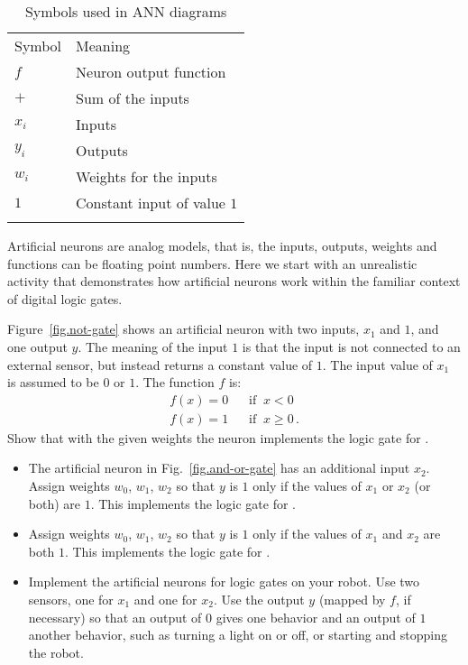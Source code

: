 \begin{table}
\caption{Symbols used in ANN diagrams}
\label{tab.ann-symbols}
\begin{tabular}{p{2cm}p{4cm}}
\svhline\noalign{\smallskip}
Symbol & Meaning \\
\noalign{\smallskip}\svhline\noalign{\smallskip}
$f$ & Neuron output function\\
$+$ & Sum of the inputs\\
$x_i$ & Inputs\\
$y_i$ & Outputs\\
$w_{i}$ & Weights for the inputs\\
$1$ & Constant input of value $1$\\
\noalign{\smallskip}\svhline\noalign{\smallskip}
\end{tabular}
\end{table}

Artificial neurons are analog models, that is, the inputs, outputs, weights and functions can be floating point numbers. Here we start with an unrealistic activity that demonstrates how artificial neurons work within the familiar context of digital logic gates.

Figure~\ref{fig.not-gate} shows an artificial neuron with two inputs, $x_1$ and $1$, and one output $y$. The meaning of the input $1$ is that the input is not connected to an external sensor, but instead returns a constant value of $1$. The input value of $x_1$ is assumed to be $0$ or $1$. The function $f$ is:
\[
\begin{array}{ll}
f(x) = 0 & \;\;\;\textrm{if} \;\; x < 0\\
f(x) = 1 & \;\;\;\textrm{if} \;\; x \geq 0\,.
\end{array}
\]
Show that with the given weights the neuron implements the logic gate for .

\begin{framed}
\begin{itemize}
\item The artificial neuron in Fig.~\ref{fig.and-or-gate} has an additional input $x_2$. Assign weights $w_0$, $w_1$, $w_2$ so that $y$ is $1$ only if the values of $x_1$ or $x_2$ (or both) are $1$. This implements the logic gate for  .
\item Assign weights $w_0$, $w_1$, $w_2$ so that $y$ is $1$ only if the values of $x_1$ and $x_2$ are both $1$. This implements the logic gate for .
\item Implement the artificial neurons for logic gates on your robot. Use two sensors, one for $x_1$ and one for $x_2$. Use the output $y$ (mapped by $f$, if necessary) so that an output of $0$ gives one behavior and an output of $1$ another behavior, such as turning a light on or off, or starting and stopping the robot.
\end{itemize}
\end{framed}

